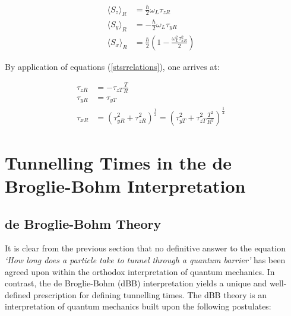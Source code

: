 \documentclass{article}
\begin{document}
\begin{subequations}
\begin{flalign}
	\langle S_z \rangle_R &= \frac{\hbar}{2}\omega_L\tau_{zR}& \\
	\langle S_y \rangle_R &= -\frac{\hbar}{2}\omega_L\tau_{yR} \\
	\langle S_x \rangle_R &= \frac{\hbar}{2}\left(1-\frac{\omega_L^2\tau_{xR}^2}{2}\right)
\end{flalign}
\end{subequations}

\noindent By application of equations (\ref{stsrrelations}), one arrives at:

\begin{subequations}
\begin{flalign}
	\tau_{zR}&=-\tau_{zT} \frac{T}{R}&\\
	\tau_{yR}&=\tau_{yT}\\
\tau_{xR}&=(\tau_{yR}^2+\tau_{zR}^2)^{\frac{1}{2}}=\left(\tau_{yT}^2+\tau_{zT}^2 \frac{T^2}{R^2}\right)^{\frac{1}{2}}
\end{flalign}
\end{subequations}

\section{Tunnelling Times in the de Broglie-Bohm Interpretation}
\label{section:dBB}

\subsection{de Broglie-Bohm Theory}
\label{subsection:dBBtheory}
\noindent It is clear from the previous section that no definitive answer to the equation \textit{`How long does a particle take to tunnel through a quantum barrier'} has been agreed upon within the orthodox interpretation of quantum mechanics. In contrast, the de Broglie-Bohm (dBB) interpretation yields a unique and well-defined prescription for defining tunnelling times. The dBB theory is an interpretation of quantum mechanics built upon the following postulates:
\end{document}
